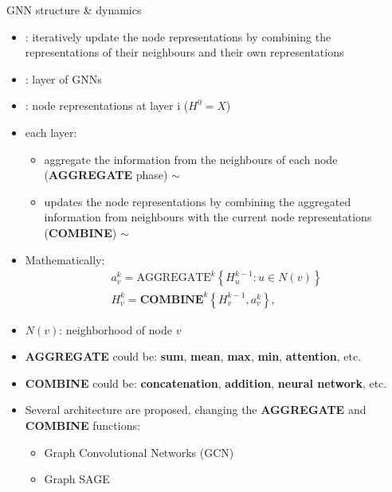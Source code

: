 \documentclass[presentation, 9pt]{beamer}\mode<presentation>{\usetheme{AMSBolognaFC}}
\begin{document}
\begin{frame}{GNN structure \& dynamics}
	\begin{itemize}
		\item {}: iteratively update the node representations 
		by combining the representations of their neighbours and their own representations
		\item {}: layer of GNNs
		\item {}: node representations at layer i ($H^0 = X$)
		\item each layer:
		\begin{itemize}
			\item aggregate the information from the neighbours of each node (\textbf{AGGREGATE} phase) $\sim$ 
			\item updates the node representations by combining the aggregated information from neighbours with the current node representations (\textbf{COMBINE}) $\sim$ 
		\end{itemize}
		\item Mathematically:
			$$
			\begin{array}{l}
			a_v^k=\text{AGGREGATE}^k\left\{H_u^{k-1}: u \in N(v)\right\} \\
			H_v^k=\mathbf{COMBINE}^k\left\{H_v^{k-1}, a_v^k\right\},
			\end{array}
			$$
		\item $N(v)$: neighborhood of node $v$
		\item \textbf{AGGREGATE} could be: \textbf{sum}, \textbf{mean}, \textbf{max}, \textbf{min}, \textbf{attention}, etc.
		\item \textbf{COMBINE} could be: \textbf{concatenation}, \textbf{addition}, \textbf{neural network}, etc.
		\item Several architecture are proposed, changing the \textbf{AGGREGATE} and \textbf{COMBINE} functions:
		\begin{itemize}
			\item Graph Convolutional Networks (GCN)~
			\item Graph SAGE~
		\end{itemize}
	\end{itemize}
\end{frame}
\end{document}
